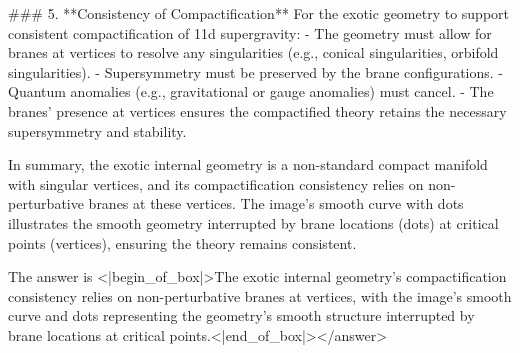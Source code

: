 ### 5. **Consistency of Compactification**  
For the exotic geometry to support consistent compactification of 11d supergravity:  
- The geometry must allow for branes at vertices to resolve any singularities (e.g., conical singularities, orbifold singularities).  
- Supersymmetry must be preserved by the brane configurations.  
- Quantum anomalies (e.g., gravitational or gauge anomalies) must cancel.  
- The branes’ presence at vertices ensures the compactified theory retains the necessary supersymmetry and stability.  


In summary, the exotic internal geometry is a non-standard compact manifold with singular vertices, and its compactification consistency relies on non-perturbative branes at these vertices. The image’s smooth curve with dots illustrates the smooth geometry interrupted by brane locations (dots) at critical points (vertices), ensuring the theory remains consistent.  

The answer is <|begin_of_box|>The exotic internal geometry’s compactification consistency relies on non-perturbative branes at vertices, with the image’s smooth curve and dots representing the geometry’s smooth structure interrupted by brane locations at critical points.<|end_of_box|></answer>